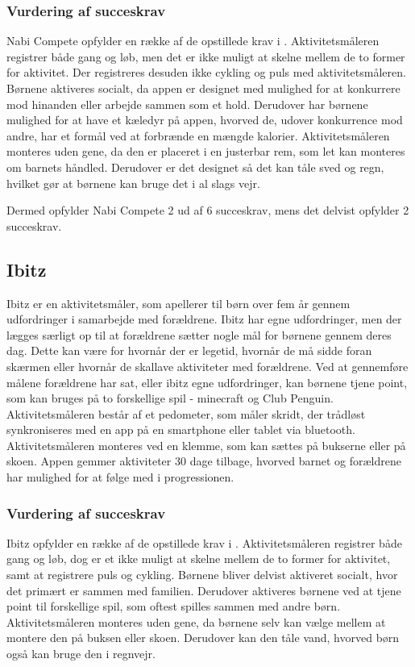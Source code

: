 \subsubsection{Vurdering af succeskrav}
Nabi Compete opfylder en række af de opstillede krav i . Aktivitetsmåleren registrer både gang og løb, men det er ikke muligt at skelne mellem de to former for aktivitet. Der registreres desuden ikke cykling og puls med aktivitetsmåleren. 
Børnene aktiveres socialt, da appen er designet med mulighed for at konkurrere mod hinanden eller arbejde sammen som et hold. Derudover har børnene mulighed for at have et kæledyr på appen, hvorved de, udover konkurrence mod andre, har et formål ved at forbrænde en mængde kalorier. Aktivitetsmåleren monteres uden gene, da den er placeret i en justerbar rem, som let kan monteres om barnets håndled. Derudover er det designet så det kan tåle sved og regn, hvilket gør at børnene kan bruge det i al slags vejr. 

Dermed opfylder Nabi Compete 2 ud af 6 succeskrav, mens det delvist opfylder 2 succeskrav.

\subsection{Ibitz}
Ibitz er en aktivitetsmåler, som apellerer til børn over fem år gennem udfordringer i samarbejde med forældrene. Ibitz har egne udfordringer, men der lægges særligt op til at forældrene sætter nogle mål for børnene gennem deres dag. Dette kan være for hvornår der er legetid, hvornår de må sidde foran skærmen eller hvornår de skallave aktiviteter med forældrene. Ved at gennemføre målene forældrene har sat, eller ibitz egne udfordringer, kan børnene tjene point, som kan bruges på to forskellige spil - minecraft og Club Penguin. Aktivitetsmåleren består af et pedometer, som måler skridt, der trådløst synkroniseres med en app på en smartphone eller tablet via bluetooth. Aktivitetsmåleren monteres ved en klemme, som kan sættes på bukserne eller på skoen. Appen gemmer aktiviteter 30 dage tilbage, hvorved barnet og forældrene har mulighed for at følge med i progressionen. 

\subsubsection{Vurdering af succeskrav}
Ibitz opfylder en række af de opstillede krav i . Aktivitetsmåleren registrer både gang og løb, dog er et ikke muligt at skelne mellem de to former for aktivitet, samt at registrere puls og cykling. Børnene bliver delvist aktiveret socialt, hvor det primært er sammen med familien. Derudover aktiveres børnene ved at tjene point til forskellige spil, som oftest spilles sammen med andre børn. Aktivitetsmåleren monteres uden gene, da børnene selv kan vælge mellem at montere den på buksen eller skoen. Derudover kan den tåle vand, hvorved børn også kan bruge den i regnvejr.  

